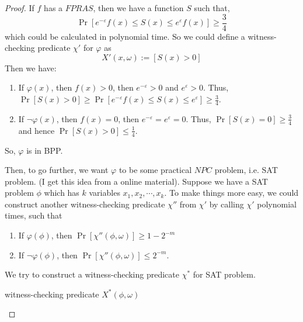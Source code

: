 \documentclass{article}
\begin{document}
\begin{proof}
  If $f$ has a $FPRAS$,
  then we have a function $S$ such that,
  \[\Pr[e^{-\varepsilon}f(x)\leq S(x)\leq e^\varepsilon f(x)] \geq \frac{3}{4}\]
  which could be calculated in polynomial time.
  So we could define a witness-checking predicate $\chi'$ for $\varphi$ as
  \[X'(x, \omega) := [S(x) > 0]\]
  Then we have:
  \begin{enumerate}[itemsep=0mm]
  \item If $\varphi(x)$, then $f(x) > 0$, then $e^{-\varepsilon}>0$ and $e^\varepsilon > 0$.
    Thus, $\Pr[S(x) > 0] \geq \Pr[e^{-\varepsilon}f(x)\leq S(x)\leq e^{\varepsilon}] \geq \frac{3}{4}$.
  \item If $\lnot\varphi(x)$, then $f(x) = 0$, then $e^{-\varepsilon} = e^\varepsilon = 0$.
    Thus, $\Pr[S(x) = 0] \geq \frac{3}{4}$ and hence $\Pr[S(x) > 0]\leq \frac{1}{4}$.
  \end{enumerate}
  So, $\varphi$ is in BPP.

  Then, to go further, we want $\varphi$ to be some practical $NPC$ problem, i.e. SAT problem.
  (I get this idea from a online material).
  Suppose we have a SAT problem $\phi$ which has $k$ variables $x_1, x_2, \cdots, x_k$.
  To make things more easy, we could construct another witness-checking predicate $\chi''$ from $\chi'$ by calling $\chi'$ polynomial times, such that
  \begin{enumerate}[itemsep=0mm]
  \item If $\varphi(\phi)$, then $\Pr[\chi''(\phi, \omega)] \geq 1 - 2^{-m}$
  \item If $\lnot\varphi(\phi)$, then $\Pr[\chi''(\phi, \omega)] \leq 2^{-m}$.
  \end{enumerate}
  We try to construct a witness-checking predicate $\chi^*$ for SAT problem.
  \begin{algorithm}[ht]
    witness-checking predicate $X^*(\phi, \omega)$ 
  \end{algorithm}
  

\end{proof}
\end{document}
